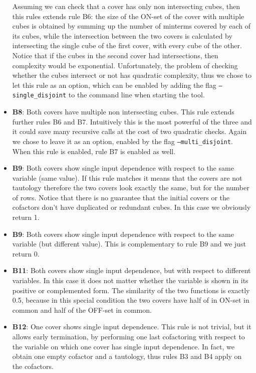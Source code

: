 \documentclass{acm_proc_article-sp}
\begin{document}
\begin{itemize}
    Assuming we can check that a cover has only non intersecting cubes, then this
    rules extends rule B6: the size of the ON-set of the cover with multiple
    cubes is obtained by summing up the number of minterms covered by each of
    its cubes, while the intersection between the two covers is calculated by
    intersecting the single cube of the first cover, with every cube of the
    other. Notice that if the cubes in the second cover had intersections, then
    complexity would be exponential.
    Unfortunately, the problem of checking whether the cubes intersect or not
    has quadratic complexity, thus we chose to let this rule as an option, which
    can be enabled by adding the flag \texttt{--single\_disjoint} to the command
    line when starting the tool.
  \item {\bf B8}: Both covers have multiple non intersecting cubes. This rule
    extends further rules B6 and B7. Intuitively this is the most powerful
    of the three and it could save many recursive calls at the cost of two
    quadratic checks. Again we chose to leave it as an option, enabled by
    the flag \texttt{--multi\_disjoint}. When this rule is enabled, rule B7
    is enabled as well.
  \item {\bf B9}: Both covers show single input dependence with respect to
    the same variable (same value). If this rule matches it means that the
    covers are not tautology therefore the two covers look exactly the same,
    but for the number of rows. Notice that there is no guarantee that the
    initial covers or the cofactors don't have duplicated or redundant
    cubes. In this case we obviously return 1.
  \item {\bf B9}: Both covers show single input dependence with respect to
    the same variable (but different value). This is complementary to rule
    B9 and we just return 0.
  \item {\bf B11}: Both covers show single input dependence, but with respect
    to different variables. In this case it does not matter whether the variable
    is shown in its positive or complemented form. The similarity of the
    two functions is exactly 0.5, because in this special condition the two
    covers have half of in ON-set in common and half of the OFF-set in common.
  \item {\bf B12}: One cover shows single input dependence. This rule is not
    trivial, but it allows early termination, by performing one last cofactoring
    with respect to the variable on which one cover has single input dependence.
    In fact, we obtain one empty cofactor and a tautology, thus rules B3 and
    B4 apply on the cofactors.
\end{itemize}
\end{document}
